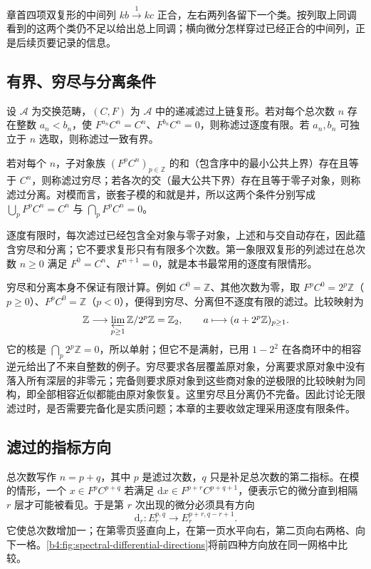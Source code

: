 \ProseParagraphBreak
章首四项双复形的中间列 \(kb\xrightarrow{1}kc\) 正合，左右两列各留下一个类。按列取上同调看到的这两个类仍不足以给出总上同调；横向微分怎样穿过已经正合的中间列，正是后续页要记录的信息。

\subsection{有界、穷尽与分离条件}
\label{b4:subsec:1401:02}

\begin{definition}\label{b4:def:finite-filtration}
	设 \(\mathcal A\) 为交换范畴，\((C,F)\) 为 \(\mathcal A\) 中的递减滤过上链复形。若对每个总次数 \(n\) 存在整数 \(a_n<b_n\)，使 \(F^{a_n}C^n=C^n\)、\(F^{b_n}C^n=0\)，则称滤过逐度有限。若 \(a_n,b_n\) 可独立于 \(n\) 选取，则称滤过一致有界。

	若对每个 \(n\)，子对象族 \((F^pC^n)_{p\in\mathbb Z}\) 的和（包含序中的最小公共上界）存在且等于 \(C^n\)，则称滤过穷尽；若各次的交（最大公共下界）存在且等于零子对象，则称滤过分离。对模而言，嵌套子模的和就是并，所以这两个条件分别写成 \(\bigcup_pF^pC^n=C^n\) 与 \(\bigcap_pF^pC^n=0\)。
\end{definition}

逐度有限时，每次滤过已经包含全对象与零子对象，上述和与交自动存在，因此蕴含穷尽和分离；它不要求复形只有有限多个次数。第一象限双复形的列滤过在总次数 \(n\ge0\) 满足 \(F^0=C^n\)、\(F^{n+1}=0\)，就是本书最常用的逐度有限情形。

\ProseParagraphBreak
穷尽和分离本身不保证有限计算。例如 \(C^0=\mathbb Z\)、其他次数为零，取 \(F^pC^0=2^p\mathbb Z\)（\(p\ge0\)）、\(F^pC^0=\mathbb Z\)（\(p<0\)），便得到穷尽、分离但不逐度有限的滤过。比较映射为
\[
	\mathbb Z\longrightarrow\varprojlim_{p\ge1}\mathbb Z/2^p\mathbb Z =\mathbb Z_2,\qquad a\longmapsto(a+2^p\mathbb Z)_{p\ge1}.
\]
它的核是 \(\bigcap_p2^p\mathbb Z=0\)，所以单射；但它不是满射，已用 \(1-2^2\) 在各商环中的相容逆元给出了不来自整数的例子。穷尽要求各层覆盖原对象，分离要求原对象中没有落入所有深层的非零元；完备则要求原对象到这些商对象的逆极限的比较映射为同构，即全部相容近似都能由原对象恢复。这里穷尽且分离仍不完备。因此讨论无限滤过时，是否需要完备化是实质问题；本章的主要收敛定理采用逐度有限条件。

\subsection{滤过的指标方向}
\label{b4:subsec:1401:03}

总次数写作 \(n=p+q\)，其中 \(p\) 是滤过次数，\(q\) 只是补足总次数的第二指标。在模的情形，一个 \(x\in F^pC^{p+q}\) 若满足 \(\mathrm{d}x\in F^{p+r}C^{p+q+1}\)，便表示它的微分直到相隔 \(r\) 层才可能被看见。于是第 \(r\) 次出现的微分必须具有方向
\[
	\mathrm{d}_r:E_r^{p,q}\longrightarrow E_r^{p+r,q-r+1}.
\]
它使总次数增加一；在第零页竖直向上，在第一页水平向右，第二页向右两格、向下一格。\cref{b4:fig:spectral-differential-directions}将前四种方向放在同一网格中比较。

